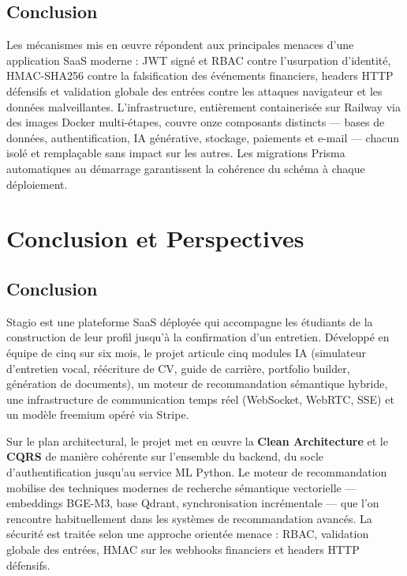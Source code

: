 ﻿\documentclass[12pt,a4paper]{report}
\begin{document}
\section*{Conclusion}
Les mécanismes mis en œuvre répondent aux principales menaces d'une application SaaS moderne : JWT signé et RBAC contre l'usurpation d'identité, HMAC-SHA256 contre la falsification des événements financiers, headers HTTP défensifs et validation globale des entrées contre les attaques navigateur et les données malveillantes. L'infrastructure, entièrement containerisée sur Railway via des images Docker multi-étapes, couvre onze composants distincts — bases de données, authentification, IA générative, stockage, paiements et e-mail — chacun isolé et remplaçable sans impact sur les autres. Les migrations Prisma automatiques au démarrage garantissent la cohérence du schéma à chaque déploiement.

\chapter*{Conclusion et Perspectives}

\section*{Conclusion}

Stagio est une plateforme SaaS déployée qui accompagne les étudiants de la construction de leur profil jusqu'à la confirmation d'un entretien. Développé en équipe de cinq sur six mois, le projet articule cinq modules IA (simulateur d'entretien vocal, réécriture de CV, guide de carrière, portfolio builder, génération de documents), un moteur de recommandation sémantique hybride, une infrastructure de communication temps réel (WebSocket, WebRTC, SSE) et un modèle freemium opéré via Stripe.

Sur le plan architectural, le projet met en œuvre la \textbf{Clean Architecture} et le \textbf{CQRS} de manière cohérente sur l'ensemble du backend, du socle d'authentification jusqu'au service ML Python. Le moteur de recommandation mobilise des techniques modernes de recherche sémantique vectorielle — embeddings BGE-M3, base Qdrant, synchronisation incrémentale — que l'on rencontre habituellement dans les systèmes de recommandation avancés. La sécurité est traitée selon une approche orientée menace : RBAC, validation globale des entrées, HMAC sur les webhooks financiers et headers HTTP défensifs.
\end{document}
